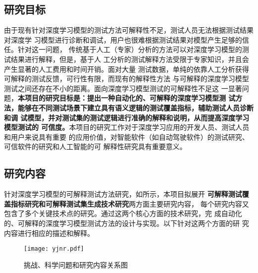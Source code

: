 \subsection{研究目标}\label{ch2target}

由于现有针对深度学习模型的测试方法可解释性不足，测试人员无法根据测试结果对深度学
习模型进行诊断和调试，用户也很难根据测试结果对模型产生足够的信任。针对这一问题，
传统基于人工（专家）分析的方法可以对深度学习模型的测试结果进行解释，但是，基于人
工分析的测试解释方法受限于专家知识，并且会产生显著的人工费用和时间开销。面对大量
测试数据，单纯的依靠人工分析获得可解释的测试反馈，可行性有限，而现有的解释性方法
与可解释的深度学习模型测试之间还存在不小的距离。面向深度学习模型测试的可解释性不足这
一显著问题，\textbf{本项目的研究目标是：提出一种自动化的、可解释的深度学习模型测
试方法，能够在不同测试场景下建立具有语义逻辑的测试覆盖指标，辅助测试人员诊断和调
试模型，并对测试集的测试逻辑进行准确的解释和说明，从而提高深度学习模型测试的
可信度。}本项目的研究工作对于深度学习应用的开发人员、测试人员和用户来说具有重要
的应用价值，对智能软件（如自动驾驶软件）的测试研究、可信软件的研究和人工智能的可
解释性研究具有重要意义。

\subsection{研究内容}\label{ch2content}

针对深度学习模型的可解释测试方法研究，如所示，本项目拟展开
    \textbf{可解释测试覆盖指标研究和可解释测试集生成技术研究}两方面主要研究内容，
    每个研究内容又包含了多个关键技术点的研究。通过这两个核心方面的技术研究，完
    成自动化的、可解释的深度学习模型测试方法的设计与实现。以下针对这两个方面的研
    究内容进行相应的描述和解释。

\begin{figure}[htp]
    \begin{small}
        \begin{center}
            \texttt{[image: yjnr.pdf]}
        \end{center}
        \caption{挑战、科学问题和研究内容关系图}
        \label{fig:ch2:yjnr}
    \end{small}
\end{figure}

